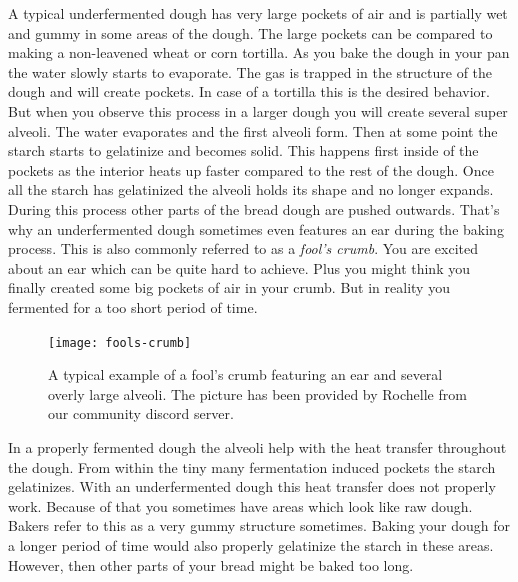 A typical underfermented dough has very large pockets of air and is partially
wet and gummy in some areas of the dough. The large pockets can be compared
to making a non-leavened wheat or corn tortilla. As you bake the dough in your pan
the water slowly starts to evaporate. The gas is trapped in the structure of the dough
and will create pockets. In case of a tortilla this is the desired behavior.
But when you observe this process in a larger dough you will create several
super alveoli. The water evaporates and the first alveoli form. Then at some point
the starch starts to gelatinize and becomes solid. This happens first inside of the pockets
as the interior heats up faster compared to the rest of the dough. Once all the starch
has gelatinized the alveoli holds its shape and no longer expands. During this
process other parts of the bread dough are pushed outwards. That's why an underfermented
dough sometimes even features an ear during the baking process. This
is also commonly referred to as a {\it fool's crumb}. You are excited about an ear which
can be quite hard to achieve. Plus you might think you finally created some big pockets
of air in your crumb. But in reality you fermented for a too short period
of time.

\begin{figure}
  \texttt{[image: fools-crumb]}
  \caption{A typical example of a fool's crumb featuring an ear and several overly
  large alveoli. The picture has been provided by Rochelle from our
  community discord server.}
  \label{fools-crumb}
\end{figure}

In a properly fermented dough the alveoli help with the heat transfer throughout the dough.
From within the tiny many fermentation induced pockets the starch gelatinizes. With
an underfermented dough this heat transfer does not properly work. Because of that
you sometimes have areas which look like raw dough. Bakers refer to this as a very
gummy structure sometimes. Baking your dough for a longer period of time would also properly
gelatinize the starch in these areas. However, then other parts of your bread
might be baked too long.

